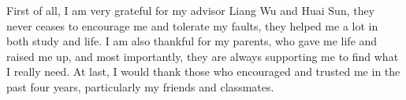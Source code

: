 

\begin{acknowledgements}
	First of all, I am very grateful for my advisor Liang Wu and Huai Sun, they never ceases to encourage me and tolerate my faults, they helped me a lot in both study and life. I am also thankful for my parents, who gave me life and raised me up, and most importantly, they are always supporting me to find what I really need. At last, I would thank those who encouraged and trusted me in the past four years, particularly my friends and classmates.
\end{acknowledgements}

